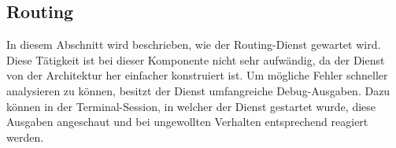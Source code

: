 \subsection{Routing}
In diesem Abschnitt wird beschrieben, wie der Routing-Dienst gewartet wird. 
Diese Tätigkeit ist bei dieser Komponente nicht sehr aufwändig, da der Dienst von der Architektur her einfacher konstruiert ist. 
Um mögliche Fehler schneller analysieren zu können, besitzt der Dienst umfangreiche Debug-Ausgaben. Dazu können in der Terminal-Session, in welcher der Dienst gestartet wurde, diese Ausgaben angeschaut und bei ungewollten Verhalten entsprechend reagiert werden.